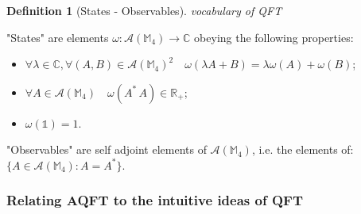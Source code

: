 \documentclass[a4paper,11pt]{article}
\numberwithin{equation}{section}
\theoremstyle{definition}
\newtheorem{definition}{Definition}
\newtheorem{comment}{Comment}
\begin{document}
\begin{definition}[States - Observables] \emph{vocabulary of QFT}

"States" are elements $\omega: \mathcal{A}(\mathbb{M}_4)\to\mathbb{C}$ obeying the following properties:
\begin{itemize}
    \item $\forall \lambda\in\mathbb{C}, \forall(A,B)\in\mathcal{A}(\mathbb{M}_4)^2\quad \omega(\lambda A+B)=\lambda \omega(A)+\omega(B)$;
    \item $\forall A \in \mathcal{A}(\mathbb{M}_4)\quad \omega(A^*\, A)\in \mathbb{R}_+$;
    \item $\omega(\mathds{1})=1$.
\end{itemize}
"Observables" are self adjoint elements of $\mathcal{A}(\mathbb{M}_4)$, i.e. the elements of: $\{A \in\mathcal{A}(\mathbb{M}_4):A=A^*\}$.
\end{definition}

\subsubsection{Relating AQFT to the intuitive ideas of QFT}

\end{document}
